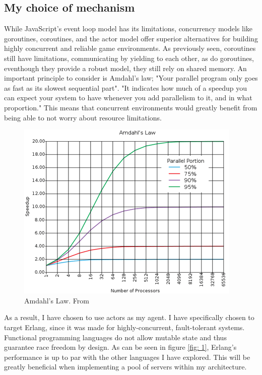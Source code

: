 \documentclass[]{project_interim}
\begin{document}
\subsection{My choice of mechanism}
While JavaScript’s event loop model has its limitations, concurrency
models like goroutines, coroutines, and the actor model offer superior
alternatives for building highly concurrent and reliable game environments.
As previously seen, coroutines still have limitations, communicating by yielding
to each other\cite{noauthor_introconcurrency_nodate}, as do goroutines,
eventhough they provide a robust model, they still rely on shared memory.
An important principle to consider is Amdahl's law; "Your parallel program only goes as fast as its slowest sequential part".\cite{yang_c_nodate}
"It indicates how much of a speedup you can expect your system to have whenever
you add parallelism to it, and in what proportion."\cite{yang_c_nodate}
This means that concurrent environments would greatly benefit from being able to
not worry about resource limitations.
\begin{figure}[ht!]
  \centering
  \includegraphics[width=0.7\linewidth]{amdahl}
  \vspace*{-0.3cm}
  \caption{Amdahl's Law. From \cite{noauthor_hitchhikers_nodate}}
  \label{fig: 0}
\end{figure}

As a result, I have chosen to use actors as my agent. I have specifically
chosen to target Erlang, since it was made for highly-concurrent, fault-tolerant
systems. Functional programming languages do not allow mutable state and thus
guarantee race freedom by design. \cite{bianchi_survey_2018}
As can be seen in figure \ref{fig: 1}, Erlang's performance is up to par with the
other languages I have explored. This will be greatly beneficial when implementing
a pool of servers within my architecture.
\end{document}

